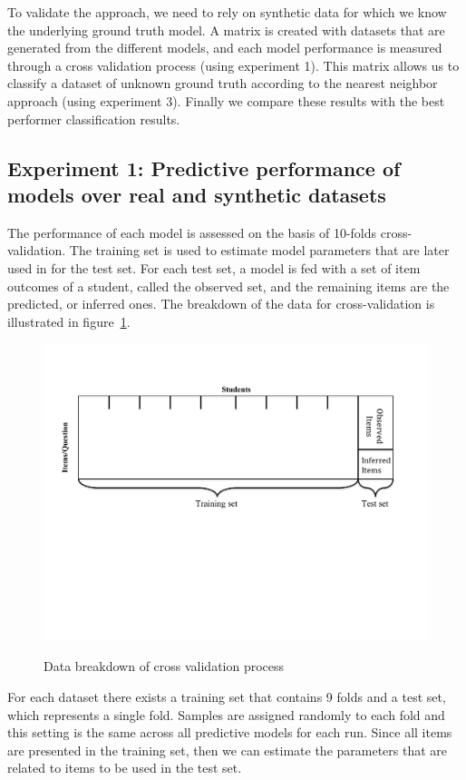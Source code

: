 \begin{enumerate}
\begin{itemize}
To validate the approach, we need to rely on synthetic data for which we know the underlying ground truth model. A matrix is created with datasets that are generated from the different models, and each model performance is measured through a cross validation process (using experiment 1). This matrix allows us to classify a dataset of unknown ground truth according to the nearest neighbor approach (using experiment 3). Finally we compare these results with the best performer classification results.

\end{itemize}
\end{enumerate}

\subsection{Experiment 1: Predictive performance of models over real and synthetic datasets}
\label{Exp1:NO}
The performance of each model is assessed on the basis of 10-folds cross-validation. The training set is used to estimate model parameters that are later used in for the test set. For each test set, a model is fed with a set of item outcomes of a student, called the observed set, and the remaining items are the predicted, or inferred ones. The breakdown of the data for cross-validation is illustrated in figure~\ref{figMethod}. 

\begin{figure}[h]
\centering
{\includegraphics[trim=1cm 9cm 2.4cm 2.4cm,clip=true,width=.7\textwidth]{images/Methodology.pdf}}
\caption{Data breakdown of cross validation process}
\label{figMethod}
\end{figure}


For each dataset there exists a training set that contains 9 folds and a test set, which represents a single fold. Samples are assigned randomly to each fold and this setting is the same across all predictive models for each run. Since all items are presented in the training set, then we can estimate the parameters that are related to items to be used in the test set. 

